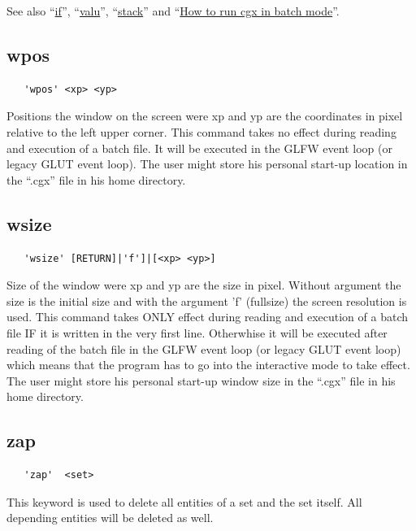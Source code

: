 \documentclass{article}
\providecommand{\htmlref}[2]{\hyperref[#2]{#1}}
\begin{document}
See also ``\htmlref{if}{if}'', ``\htmlref{valu}{valu}'', ``\htmlref{stack}{stack}'' and ``\htmlref{How to run cgx in batch mode}{How to run cgx in batch mode}''.

\subsection{\label{wpos}wpos}
\begin{verbatim}
   'wpos' <xp> <yp>
\end{verbatim}
Positions the window on the screen were xp and yp are the coordinates in pixel relative to the left upper corner. This command takes no effect during reading and execution of a batch file. It will be executed in the GLFW event loop (or legacy GLUT event loop). The user might store his personal start-up location in the ``.cgx'' file in his home directory.

\subsection{\label{wsize}wsize}
\begin{verbatim}
   'wsize' [RETURN]|'f']|[<xp> <yp>]
\end{verbatim}
Size of the window were xp and yp are the size in pixel. Without argument the size is the initial size and with the argument 'f' (fullsize) the screen resolution is used. This command takes ONLY effect during reading and execution of a batch file IF it is written in the very first line. Otherwhise it will be executed after reading of the batch file in the GLFW event loop (or legacy GLUT event loop) which means that the program has to go into the interactive mode to take effect. The user might store his personal start-up window size in the ``.cgx'' file in his home directory.

\subsection{\label{zap}zap}
\begin{verbatim}
   'zap'  <set> 
\end{verbatim}
This keyword is used to delete all entities of a set and the set itself. All depending entities will be deleted as well.
\end{document}
